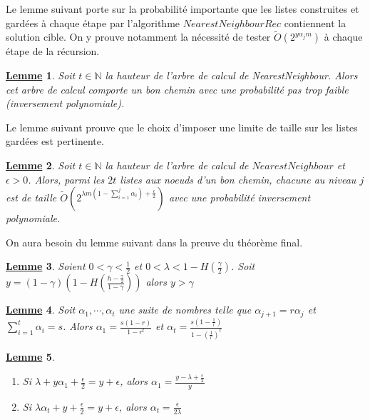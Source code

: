 \documentclass[12pt,openany]{report}
\newtheorem{lemme}{\underline{Lemme}}
\begin{document}
Le lemme suivant porte sur la probabilité importante que les listes construites
et gardées à chaque étape par l’algorithme $NearestNeighbourRec $ contiennent
la solution cible. On y prouve notamment la nécessité de tester $\tilde{O}(2^{y\alpha_j m})$ à
chaque étape de la récursion.
\begin{lemme} Soit $ t \in \mathbb{N} $ la hauteur de l’arbre de calcul de NearestNeighbour. Alors
cet arbre de calcul comporte un bon chemin avec une probabilité pas trop faible
(inversement polynomiale).
\end{lemme}
Le lemme suivant prouve que le choix d’imposer une limite de taille sur les
listes gardées est pertinente.
\begin{lemme}
Soit $ t \in \mathbb{N} $ la hauteur de l'arbre de calcul de $ NearestNeighbour $ et $\epsilon > 0$.
Alors, parmi les $2t$ listes aux noeuds d’un bon chemin, chacune au niveau $j$ est
de taille {\large $ \tilde{O}\left( 2^{\lambda m (1-\sum_{i=1}^{j}\alpha_i)+\frac{\epsilon}{2}}  \right)  $} avec une probabilité inversement polynomiale.
\end{lemme}
On aura besoin du lemme suivant dans la preuve du théorème final.

\begin{lemme} Soient $0< \gamma < \frac{1}{2}  $ et $ 0 < \lambda < 1-H(\frac{\gamma}{2})$. Soit $y = (1-\gamma)\left( 1-H(\frac{h-\frac{\gamma}{2}}{1-\gamma})  \right)  $ alors $ y>\gamma $

\end{lemme}

\begin{lemme} Soit $ \alpha_1,\cdots,\alpha_t $ une suite de nombres telle que {\large $\alpha_{j+1}=r \alpha_j  $} et {\large $ \sum_{i=1}^{t}\alpha_i=s  $}. Alors {\large $ \alpha_1=\frac{s(1-r)}{1-r^t} $} et {\large $ \alpha_t= \frac{s(1-\frac{1}{r})}{1-(\frac{1}{r})^t}  $}


\end{lemme}

\begin{lemme} 
\begin{enumerate}
\item Si $ \lambda + y \alpha_1 + \frac{\epsilon}{2}   = y+ \epsilon $, alors $ \alpha_1 = \frac{y-\lambda+\frac{\epsilon}{2}}{y}  $

\item Si $\lambda \alpha_t + y + \frac{\epsilon}{2} = y + \epsilon  $, alors $ \alpha_t=\frac{\epsilon}{2 \lambda} $
\end{enumerate}
\end{lemme}
\end{document}
